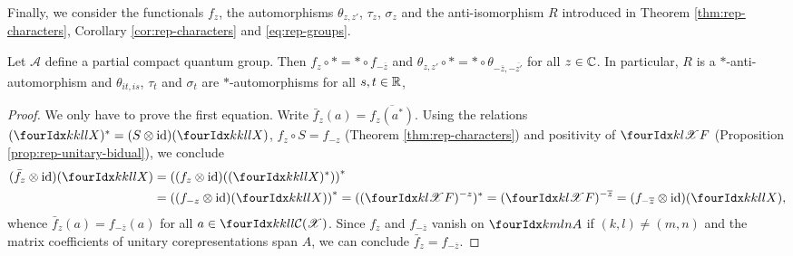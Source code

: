 Finally, we consider the functionals $f_{z}$, the automorphisms
$\theta_{z,z'}$, $\tau_{z}$, $\sigma_{z}$ and the anti-isomorphism $R$
introduced in Theorem \ref{thm:rep-characters}, Corollary
\ref{cor:rep-characters} and \eqref{eq:rep-groups}.
\begin{Prop} \label{prop:rep-unitary-characters} Let $\mathscr{A}$
  define a partial compact quantum group.  Then $f_{z} \circ \ast =
  \ast \circ f_{-\overline{z}}$ and $\theta_{z,z'} \circ * = * \circ
  \theta_{-\overline{z},-\overline{z'}}$ for all $z\in \mathbb{C}$. In
  particular, $R$ is a $*$-anti-automorphism and $\theta_{it,is}$,
  $\tau_{t}$ and $\sigma_{t}$ are $*$-automorphisms for all $s,t\in
  \mathbb{R}$,
\end{Prop}
\begin{proof}
  We only have to prove the first equation.  Write $\bar{f}_z(a) =
  \overline{f_z(a^*)}$. Using the relations
  $ (\Gr{X}{k}{l}{k}{l})^{*}=(S \otimes \id)(\Gr{X}{k}{l}{k}{l})$,  $f_{z} \circ S=f_{-z}$
  (Theorem \ref{thm:rep-characters}) and
  positivity of $\Gr{F}{k}{l}{}{\mathscr{X}}$ (Proposition \ref{prop:rep-unitary-bidual}), we conclude
     \begin{align*}
       (\bar{f}_z \otimes
       \id)(\Gr{X}{k}{l}{k}{l})
&=       \left((f_{z} \otimes
       \id)((\Gr{X}{k}{l}{k}{l})^{*})\right)^{*} \\
& = \left((f_{-z} \otimes \id)(\Gr{X}{k}{l}{k}{l})\right)^{*} 
 =
((\Gr{F}{k}{l}{}{\mathscr{X}})^{-z})^{*} 
=       (\Gr{F}{k}{l}{}{\mathscr{X}})^{-\overline{z}} = (f_{-\overline{z}}
\otimes \id)(\Gr{X}{k}{l}{k}{l}),
     \end{align*}
whence $\bar{f}_z(a) = f_{-\overline{z}}(a)$ for all $a\in
\Gr{\mathcal{C}(\mathscr{X})}{k}{l}{k}{l}$. Since $f_{z}$ and
$f_{-\overline{z}}$ vanish on $\Gr{A}{k}{l}{m}{n}$ if $(k,l)\neq
(m,n)$ and the matrix coefficients of unitary 
corepresentations span $A$, we can conclude $\bar{f}_{z}=f_{-\overline{z}}$.
\end{proof}




